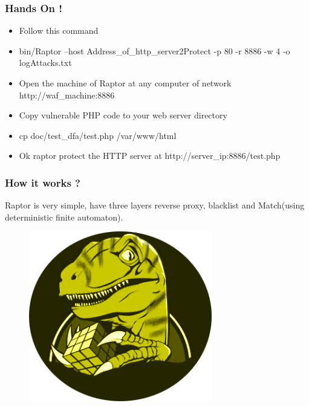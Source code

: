 \documentclass[serif,mathserif]{beamer}
\begin{document}
\begin{frame}
  \frametitle{Hands On !}
  \begin{itemize}
  \item Follow this command
  \item bin/Raptor --host Address\_of\_http\_server2Protect -p 80 -r 8886 -w 4 -o logAttacks.txt 
  \item Open the machine of Raptor at any computer of network http://waf\_machine:8886
  \item Copy vulnerable PHP code to your web server directory
  \item cp doc/test\_dfa/test.php /var/www/html
  \item Ok raptor protect the HTTP server at http://server\_ip:8886/test.php
  \end{itemize}
\end{frame}

\begin{frame}
  \frametitle{How it works ?}
   Raptor is very simple, have three layers reverse proxy, blacklist and Match(using deterministic finite automaton).
  \begin{itemize} 
  \begin{figure}[]    
    \centering
    \includegraphics[width=8cm]{images/raptor2.png} 
  \end{figure}
  \end{itemize}
\end{frame}
\end{document}

